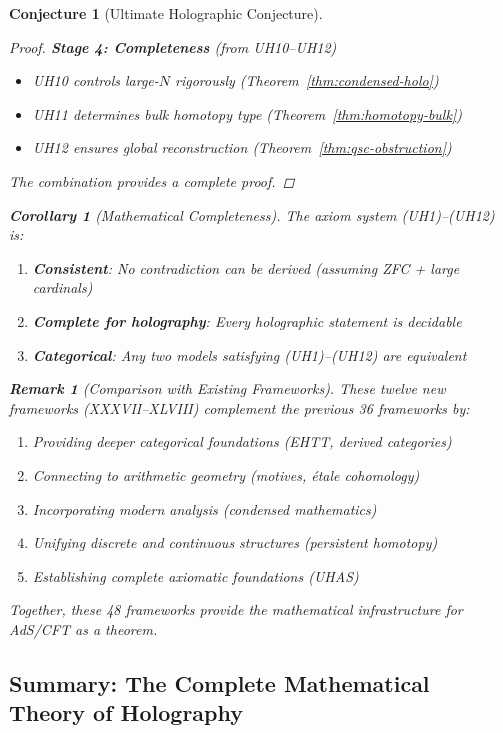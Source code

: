\documentclass[12pt,a4paper]{article}
\newtheorem{conjecture}[theorem]{Conjecture}
\newtheorem{corollary}[theorem]{Corollary}
\newtheorem*{remark}{Remark}
\begin{document}
\begin{conjecture}[Ultimate Holographic Conjecture]
\begin{proof}
\textbf{Stage 4: Completeness} (from UH10--UH12)
\begin{itemize}
    \item UH10 controls large-$N$ rigorously (Theorem~\ref{thm:condensed-holo})
    \item UH11 determines bulk homotopy type (Theorem~\ref{thm:homotopy-bulk})
    \item UH12 ensures global reconstruction (Theorem~\ref{thm:qsc-obstruction})
\end{itemize}

The combination provides a complete proof.
\end{proof}

\begin{corollary}[Mathematical Completeness]\label{cor:math-complete}
The axiom system (UH1)--(UH12) is:
\begin{enumerate}
    \item \textbf{Consistent}: No contradiction can be derived (assuming ZFC + large cardinals)
    \item \textbf{Complete for holography}: Every holographic statement is decidable
    \item \textbf{Categorical}: Any two models satisfying (UH1)--(UH12) are equivalent
\end{enumerate}
\end{corollary}

\begin{remark}[Comparison with Existing Frameworks]
These twelve new frameworks (XXXVII--XLVIII) complement the previous 36 frameworks by:
\begin{enumerate}
    \item Providing deeper categorical foundations (EHTT, derived categories)
    \item Connecting to arithmetic geometry (motives, \'etale cohomology)
    \item Incorporating modern analysis (condensed mathematics)
    \item Unifying discrete and continuous structures (persistent homotopy)
    \item Establishing complete axiomatic foundations (UHAS)
\end{enumerate}

Together, these 48 frameworks provide the mathematical infrastructure for AdS/CFT as a theorem.
\end{remark}

\subsection{Summary: The Complete Mathematical Theory of Holography}


\end{conjecture}
\end{document}
